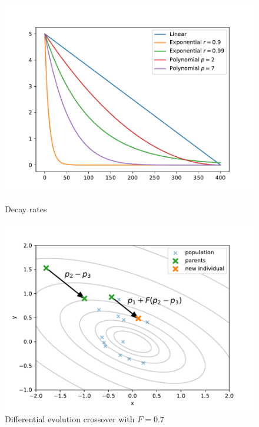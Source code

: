 \begin{figure}
    \centering
    \begin{minipage}[t]{0.48\textwidth}
        \centering
        \includegraphics[width=\textwidth]{img/render_decayrate.pdf}
        \caption{Decay rates}
        \label{fig:decayrates}
    \end{minipage}
    \hfill
    \begin{minipage}[t]{0.48\textwidth}
        \centering
        \includegraphics[width=\textwidth]{img/render_differential.pdf}
        \caption[Differential evolution crossover]{Differential evolution crossover with $F=0.7$}
        \label{fig:differentialevolution}
    \end{minipage}
\end{figure}

